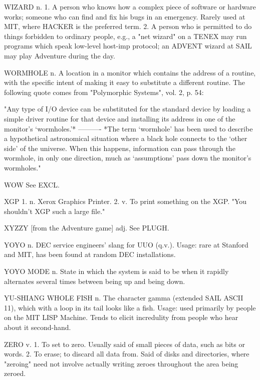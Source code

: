 WIZARD n. 1. A person who knows how a complex piece of software or
   hardware works; someone who can find and fix his bugs in an
   emergency.  Rarely used at MIT, where HACKER is the preferred term.
   2. A person who is permitted to do things forbidden to ordinary
   people, e.g., a "net wizard" on a TENEX may run programs which
   speak low-level host-imp protocol; an ADVENT wizard at SAIL may
   play Adventure during the day.

WORMHOLE n. A location in a monitor which contains the address of a
   routine, with the specific intent of making it easy to substitute a
   different routine.  The following quote comes from "Polymorphic
   Systems", vol. 2, p. 54:

   "Any type of I/O device can be substituted for the standard device
   by loading a simple driver routine for that device and installing
   its address in one of the monitor's `wormholes.'*
   ----------
   *The term `wormhole' has been used to describe a hypothetical
   astronomical situation where a black hole connects to the `other
   side' of the universe.  When this happens, information can pass
   through the wormhole, in only one direction, much as `assumptions'
   pass down the monitor's wormholes."

WOW  See EXCL.

XGP 1. n. Xerox Graphics Printer.  2. v. To print something on the
   XGP.	 "You shouldn't XGP such a large file."

XYZZY [from the Adventure game] adj. See PLUGH.

YOYO n. DEC service engineers' slang for UUO (q.v.).  Usage: rare at
   Stanford and MIT, has been found at random DEC installations.

YOYO MODE n. State in which the system is said to be when it rapidly
   alternates several times between being up and being down.

YU-SHIANG WHOLE FISH n. The character gamma (extended SAIL ASCII 11),
   which with a loop in its tail looks like a fish.  Usage: used
   primarily by people on the MIT LISP Machine.	 Tends to elicit
   incredulity from people who hear about it second-hand.

ZERO v. 1. To set to zero.  Usually said of small pieces of data, such
   as bits or words.  2. To erase; to discard all data from.  Said of
   disks and directories, where "zeroing" need not involve actually
   writing zeroes throughout the area being zeroed.

